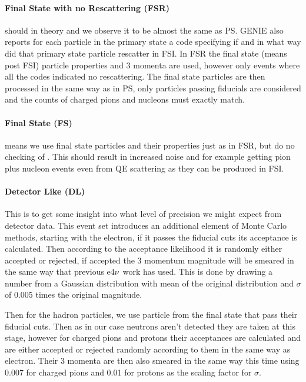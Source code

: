 \documentclass[a4paper,12pt]{article}
\newcommand{\efn}{e4$\nu$}
\newcommand{\verbb}[1]{\text{\Verb|#1|}}
\begin{document}
\paragraph{Final State with no Rescattering (FSR)} should in theory and we observe it to be almost the same as PS.
GENIE also reports for each particle in the primary state a \verbb{resc} code specifying if and in what way did that primary state particle rescatter in FSI.
In FSR the final state (means post FSI) particle properties and 3 momenta are used, however only events where all the \verbb{resc} codes indicated no rescattering.
The final state particles are then processed in the same way as in PS, only particles passing fiducials are considered and the counts of charged pions and nucleons must exactly match.

\paragraph{Final State (FS)} means we use final state particles and their properties just as in FSR, but do no checking of \verbb{resc}.
This should result in increased noise and for example getting pion plus nucleon events even from QE scattering as they can be produced in FSI.

\paragraph{Detector Like (DL)} This is to get some insight into what level of precision we might expect from detector data.
This event set introduces an additional element of Monte Carlo methods, starting with the electron, if it passes the fiducial cuts its acceptance is calculated.
Then according to the acceptance likelihood it is randomly either accepted or rejected, if accepted the 3 momentum magnitude will be smeared in the same way that previous \efn\ work has used.
This is done by drawing a number from a Gaussian distribution with mean of the original distribution and $\sigma$ of 0.005 times the original magnitude.

Then for the hadron particles, we use particle from the final state that pass their fiducial cuts.
Then as in our case neutrons aren't detected they are taken at this stage, however for charged pions and protons their acceptances are calculated and are either accepted or rejected randomly according to them in the same way as electron.
Their 3 momenta are then also smeared in the same way this time using 0.007 for charged pions and 0.01 for protons as the scaling factor for $\sigma$.
\end{document}
